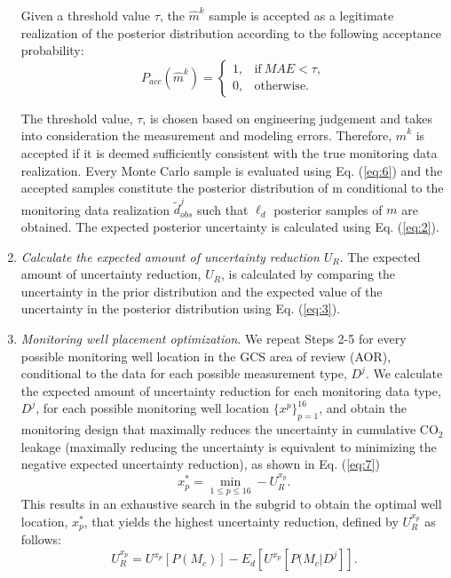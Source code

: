 \documentclass[a4paper,fleqn]{cas-sc}
\begin{document}
\begin{enumerate}[Step 1.]
Given a threshold value $\tau$, the $\hat{m}^k$ sample is accepted as a legitimate realization of the posterior distribution according to the following acceptance probability:
\begin{equation} \label{eq:6}
    P_{acc}(\hat{m}^k) = 
    \begin{cases}
      1, & \text{if}\ MAE<\tau ,\\
      0, & \text{otherwise}.
    \end{cases}
\end{equation}

The threshold value, $\tau$, is chosen based on engineering judgement and takes into consideration the measurement and modeling errors. Therefore, $\hat{m}^k$ is accepted if it is deemed sufficiently consistent with the true monitoring data realization. Every Monte Carlo sample is evaluated using Eq. (\ref{eq:6}) and the accepted samples constitute the posterior distribution of m conditional to the monitoring data realization $\widetilde{d}^j_{obs}$ such that $\ell_d$ posterior samples of $m$ are obtained. The expected posterior uncertainty is calculated using Eq. (\ref{eq:2}). 

\item \textit{Calculate the expected amount of uncertainty reduction $U_R$}. The expected amount of uncertainty reduction, $U_R$, is calculated by comparing the uncertainty in the prior distribution and the expected value of the uncertainty in the posterior distribution using Eq. (\ref{eq:3}). 

\item \textit{Monitoring well placement optimization}. We repeat Steps 2-5 for every possible monitoring well location in the GCS area of review (AOR), conditional to the data for each possible measurement type, $D^j$. We calculate the expected amount of uncertainty reduction for each monitoring data type, $D^j$, for each possible monitoring well location $\{{x^p}\}_{p=1}^{16}$, and obtain the monitoring design that maximally reduces the uncertainty in cumulative CO$_2$ leakage (maximally reducing the uncertainty is equivalent to minimizing the negative expected uncertainty reduction), as shown in Eq. (\ref{eq:7})
\begin{equation} \label{eq:7}
    x_p^* = \min\limits_{1\leq p \leq 16} -U_R^{x_p} .
\end{equation}
This results in an exhaustive search in the subgrid to obtain the optimal well location, $x_p^*$, that yields the highest uncertainty reduction, defined by $U_R^{x_p}$ as follows:
\begin{equation} \label{eq:8}
    U_R^{x_p} = U^{x_p}[P(M_c)] - E_d[U^{x_p}[P(M_c \vert D^j]] .
\end{equation}
\end{enumerate}
\end{document}
